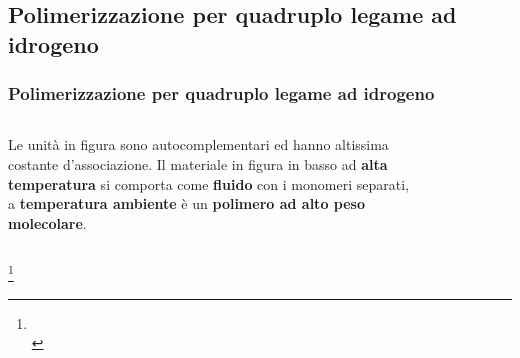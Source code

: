 \subsection{Polimerizzazione per quadruplo legame ad idrogeno}
\begin{frame}\frametitle{Polimerizzazione per quadruplo legame ad idrogeno}
\begin{columns}
Le unità in figura sono autocomplementari ed hanno altissima costante d'associazione. Il materiale in figura in basso ad \textbf{alta temperatura} si comporta come \textbf{fluido} con i monomeri separati, a \textbf{temperatura ambiente} è un \textbf{polimero ad alto peso molecolare}. 
\begin{figure}{}\end{figure}
\end{columns}\vspace{-5pt}
\begin{figure}{}\end{figure}\vspace{-20pt}
\footnote{\tiny \leading{5pt}  \\ }
\end{frame}

